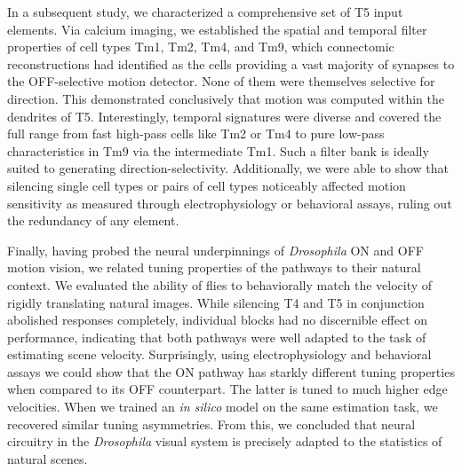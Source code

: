 In a subsequent study, we characterized a comprehensive set of T5 input elements. Via calcium imaging, we established the spatial and temporal filter properties of cell types Tm1, Tm2, Tm4, and Tm9, which connectomic reconstructions had identified as the cells providing a vast majority of synapses to the OFF-selective motion detector. None of them were themselves selective for direction. This demonstrated conclusively that motion was computed within the dendrites of T5. Interestingly, temporal signatures were diverse and covered the full range from fast high-pass cells like Tm2 or Tm4 to pure low-pass characteristics in Tm9 via the intermediate Tm1. Such a filter bank is ideally suited to generating direction-selectivity. Additionally, we were able to show that silencing single cell types or pairs of cell types noticeably affected motion sensitivity as measured through electrophysiology or behavioral assays, ruling out the redundancy of any element.

Finally, having probed the neural underpinnings of \textit{Drosophila} ON and OFF motion vision, we related tuning properties of the pathways to their natural context. We evaluated the ability of flies to behaviorally match the velocity of rigidly translating natural images. While silencing T4 and T5 in conjunction abolished responses completely, individual blocks had no discernible effect on performance, indicating that both pathways were well adapted to the task of estimating scene velocity. Surprisingly, using electrophysiology and behavioral assays we could show that the ON pathway has starkly different tuning properties when compared to its OFF counterpart. The latter is tuned to much higher edge velocities. When we trained an \textit{in silico} model on the same estimation task, we recovered similar tuning asymmetries. From this, we concluded that neural circuitry in the \textit{Drosophila} visual system is precisely adapted to the statistics of natural scenes.